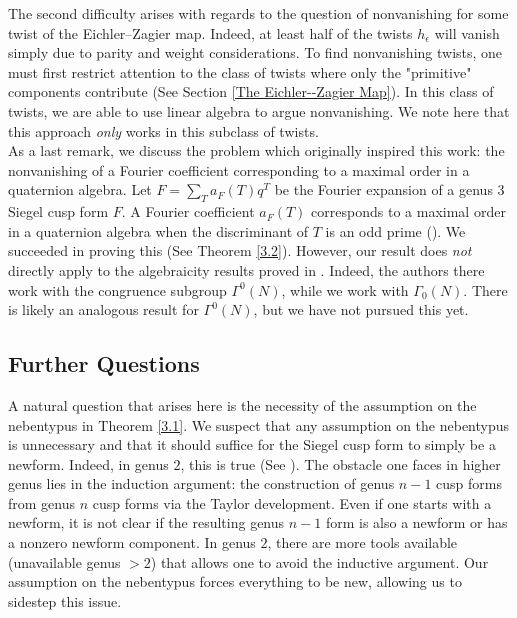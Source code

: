 \documentclass[11pt]{article}
\theoremstyle{definition}
\theoremstyle{remark}
\begin{document}
The second difficulty arises with regards to the question of nonvanishing for some twist of the Eichler--Zagier map. Indeed, at least half of the twists $h_\epsilon$ will vanish simply due to parity and weight considerations. To find nonvanishing twists, one must first restrict attention to the class of twists where only the "primitive" components contribute (See Section \ref{The Eichler--Zagier Map}). In this class of twists, we are able to use linear algebra to argue nonvanishing. We note here that this approach \textit{only} works in this subclass of twists. \\

As a last remark, we discuss the problem which originally inspired this work: the nonvanishing of a Fourier coefficient corresponding to a maximal order in a quaternion algebra. Let $F = \sum_T a_F(T) q^T$ be the Fourier expansion of a genus $3$ Siegel cusp form $F$. A Fourier coefficient $a_F(T)$ corresponds to a maximal order in a quaternion algebra when the discriminant of $T$ is an odd prime (\cite{BD}). We succeeded in proving this (See Theorem \ref{3.2}). However, our result does \textit{not} directly apply to the algebraicity results proved in \cite{eischen}. Indeed, the authors there work with the congruence subgroup $\Gamma^0(N)$, while we work with $\Gamma_0(N)$. There is likely an analogous result for $\Gamma^0(N)$, but we have not pursued this yet. \\

\subsection{Further Questions}

A natural question that arises here is the necessity of the assumption on the nebentypus in Theorem \ref{3.1}. We suspect that any assumption on the nebentypus is unnecessary and that it should suffice for the Siegel cusp form to simply be a newform. Indeed, in genus $2$, this is true (See \cite{anamby}). The obstacle one faces in higher genus lies in the induction argument: the construction of genus $n-1$ cusp forms from genus $n$ cusp forms via the Taylor development. Even if one starts with a newform, it is not clear if the resulting genus $n-1$ form is also a newform or has a nonzero newform component. In genus $2$, there are more tools available (unavailable genus $> 2$) that allows one to avoid the inductive argument. Our assumption on the nebentypus forces everything to be new, allowing us to sidestep this issue. \\
\end{document}
